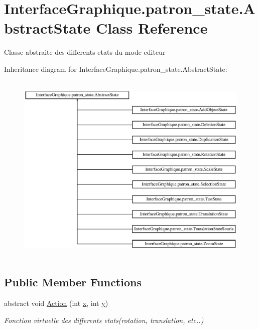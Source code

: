 \hypertarget{class_interface_graphique_1_1patron__state_1_1_abstract_state}{\section{Interface\-Graphique.\-patron\-\_\-state.\-Abstract\-State Class Reference}
\label{class_interface_graphique_1_1patron__state_1_1_abstract_state}
}


Classe abstraite des differents etats du mode editeur  


Inheritance diagram for Interface\-Graphique.\-patron\-\_\-state.\-Abstract\-State\-:\begin{figure}[H]
\begin{center}
\leavevmode
\includegraphics[height=9.305137cm]{class_interface_graphique_1_1patron__state_1_1_abstract_state}
\end{center}
\end{figure}
\subsection*{Public Member Functions}
\begin{DoxyCompactItemize}
\item 
abstract void \hyperlink{class_interface_graphique_1_1patron__state_1_1_abstract_state_a8df97c5a2784f9757608d669fbb1c6b5}{Action} (int \hyperlink{group__inf2990_ga6150e0515f7202e2fb518f7206ed97dc}{x}, int \hyperlink{group__inf2990_ga0a2f84ed7838f07779ae24c5a9086d33}{y})
\begin{DoxyCompactList}\small\item\em Fonction virtuelle des differents etats(rotation, translation, etc..) \end{DoxyCompactList}\end{DoxyCompactItemize}


